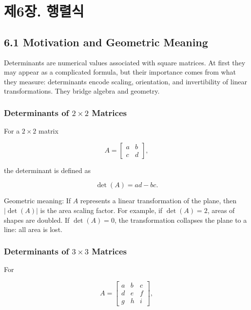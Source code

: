 \documentclass[
  12pt,
  a4paper,
]{article}
\let\oldsection\section
\renewcommand{\section}{\clearpage\oldsection}
\begin{document}
\section{제6장. 행렬식}\label{chapter-6-determinants}

\subsection{6.1 Motivation and Geometric
Meaning}\label{61-motivation-and-geometric-meaning}

Determinants are numerical values associated with square matrices. At
first they may appear as a complicated formula, but their importance
comes from what they measure: determinants encode scaling, orientation,
and invertibility of linear transformations. They bridge algebra and
geometry.

\subsubsection{\texorpdfstring{Determinants of \(2 \times 2\)
Matrices}{Determinants of 2 \textbackslash times 2 Matrices}}\label{determinants-of--2-uxd7-2--matrices}

For a \(2 \times 2\) matrix

\[A = \begin{bmatrix} a & b \\ c & d \end{bmatrix},\]

the determinant is defined as

\[\det(A) = ad - bc.\]

Geometric meaning: If \(A\) represents a linear transformation of the
plane, then \(|\det(A)|\) is the area scaling factor. For example, if
\(\det(A) = 2\), areas of shapes are doubled. If \(\det(A) = 0\), the
transformation collapses the plane to a line: all area is lost.

\subsubsection{\texorpdfstring{Determinants of \(3 \times 3\)
Matrices}{Determinants of 3 \textbackslash times 3 Matrices}}\label{determinants-of--3-uxd7-3--matrices}

For

\[A = \begin{bmatrix}
a & b & c \\
d & e & f \\
g & h & i
\end{bmatrix},\]
\end{document}

